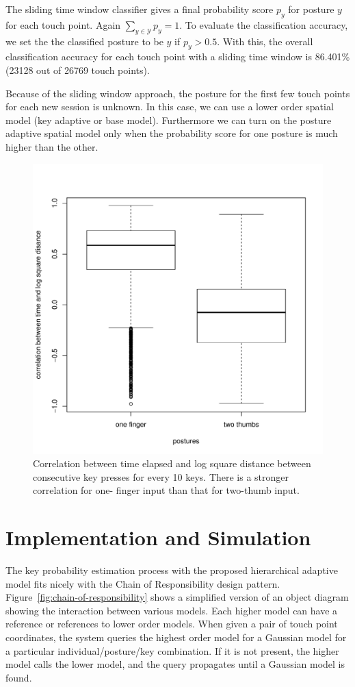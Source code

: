 \documentclass{sigchi}
\begin{document}
The sliding time window classifier gives a final probability score $p_y$ for posture
$y$ for each touch point. Again $\displaystyle\sum_{y\in \mathcal{Y}}p_y = 1$. To evaluate the classification accuracy, we set the the
classified posture to be $y$ if $p_y > 0.5$. With this, the overall classification 
accuracy for each touch point with a sliding time window
is 86.401\% (23128 out of 26769 touch points).

Because of the sliding window approach, the posture for the first few touch points  
for each new session is unknown. In this case, we can use a lower order spatial 
model (key adaptive or base model). Furthermore  we can turn on the posture 
adaptive spatial model only when the probability score for one posture is much 
higher than the other.

\begin{figure}[tb]
  \centering
  \includegraphics[width=0.8\columnwidth]{figures/boxplot.pdf}
  \caption{Correlation between time elapsed and log square distance between
  consecutive key presses for every 10 keys. There is a stronger correlation for
  one- finger input than that for two-thumb input.}
  \label{fig:boxplot}
\end{figure}

\section{Implementation and Simulation}
The key probability estimation process with the proposed hierarchical adaptive model fits nicely with the
Chain of Responsibility design pattern.
Figure~\ref{fig:chain-of-responsibility} shows a simplified version of an object
diagram showing the interaction between various models. Each higher model can
have a reference or references to lower order models. When given a pair of touch
point coordinates, the system queries the highest order model for a Gaussian
model for a particular individual/posture/key combination. If it is not present, 
the higher model calls the lower model, and the
query propagates until a Gaussian model is found. 
\end{document}
